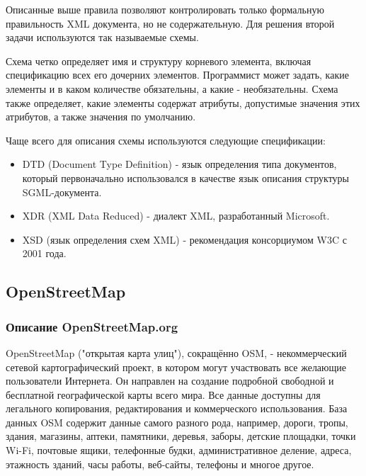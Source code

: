 \documentclass[12pt,a4paper,oneside]{article} %
\begin{document}
Описанные выше правила позволяют контролировать только формальную \linebreak
правильность XML документа, но не содержательную. Для решения \linebreak
второй задачи используются так называемые схемы.

Схема четко определяет имя и структуру корневого элемента, включая\linebreak
спецификацию всех его дочерних элементов. Программист может задать, \linebreak
какие элементы и в каком количестве обязательны, а какие - \linebreak
необязательны. Схема также определяет, какие элементы содержат\linebreak
 атрибуты, допустимые значения этих атрибутов, а также значения\linebreak
  по умолчанию.

Чаще всего для описания схемы используются следующие спецификации:
\begin{itemize}
\item	DTD (Document Type Definition) - язык определения типа \linebreak
документов, который первоначально использовался в качестве язык \linebreak
описания структуры SGML-документа.
\item	XDR (XML Data Reduced) - диалект XML, разработанный Microsoft.
\item	XSD (язык определения схем XML) - рекомендация консорциумом W3C\linebreak
 с 2001 года.
\end{itemize}

\newpage
\subsection{OpenStreetMap}
\subsubsection{Описание OpenStreetMap.org}

OpenStreetMap ("открытая карта улиц"), сокращённо OSM, - \linebreak
некоммерческий сетевой картографический проект, в котором могут \linebreak
участвовать все желающие пользователи Интернета. Он направлен на \linebreak
создание подробной свободной и бесплатной географической карты \linebreak
всего мира. Все данные доступны для легального копирования, \linebreak
редактирования и коммерческого использования. База данных OSM \linebreak
содержит данные самого разного рода, например, дороги, тропы, \linebreak
здания, магазины, аптеки, памятники, деревья, заборы, детские \linebreak
площадки, точки Wi-Fi, почтовые ящики, телефонные будки, \linebreak
административное деление, адреса, этажность зданий, часы работы,\linebreak
веб-сайты, телефоны и многое другое.
\end{document}
